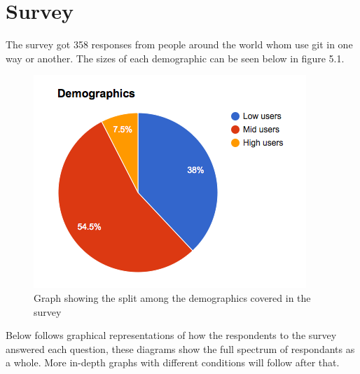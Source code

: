 \documentclass[a4paper,oneside]{bth} %
\begin{document}
			\section{Survey}
			The survey got 358 responses from people around the world whom use git in one way or another. The sizes of each demographic can be seen below in figure 5.1.
			\begin{figure}[H]
				\centering
				\includegraphics[width=0.5\linewidth]{graphs/demo_split.png}
				\caption{Graph showing the split among the demographics covered in the survey}
				\label{fig:graph-demo-split}
			\end{figure}
			Below follows graphical representations of how the respondents to the survey answered each question, these diagrams show the full spectrum of respondants as a whole. More in-depth graphs with different conditions will follow after that.
\end{document}
